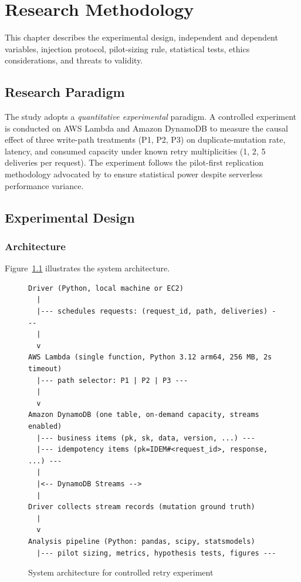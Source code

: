 \chapter{Research Methodology}

This chapter describes the experimental design, independent and dependent variables, injection protocol, pilot-sizing rule, statistical tests, ethics considerations, and threats to validity.

\section{Research Paradigm}

The study adopts a \textit{quantitative experimental} paradigm. A controlled experiment is conducted on AWS Lambda and Amazon DynamoDB to measure the causal effect of three write-path treatments (P1, P2, P3) on duplicate-mutation rate, latency, and consumed capacity under known retry multiplicities (1, 2, 5 deliveries per request). The experiment follows the pilot-first replication methodology advocated by \citet{Wen2025Variance} to ensure statistical power despite serverless performance variance.

\section{Experimental Design}

\subsection{Architecture}

Figure~\ref{fig:architecture} illustrates the system architecture.

\begin{figure}[h]
\centering
\begin{verbatim}
Driver (Python, local machine or EC2)
  |
  |--- schedules requests: (request_id, path, deliveries) ---
  |
  v
AWS Lambda (single function, Python 3.12 arm64, 256 MB, 2s timeout)
  |--- path selector: P1 | P2 | P3 ---
  |
  v
Amazon DynamoDB (one table, on-demand capacity, streams enabled)
  |--- business items (pk, sk, data, version, ...) ---
  |--- idempotency items (pk=IDEM#<request_id>, response, ...) ---
  |
  |<-- DynamoDB Streams -->
  |
Driver collects stream records (mutation ground truth)
  |
  v
Analysis pipeline (Python: pandas, scipy, statsmodels)
  |--- pilot sizing, metrics, hypothesis tests, figures ---
\end{verbatim}
\caption{System architecture for controlled retry experiment}
\label{fig:architecture}
\end{figure}

